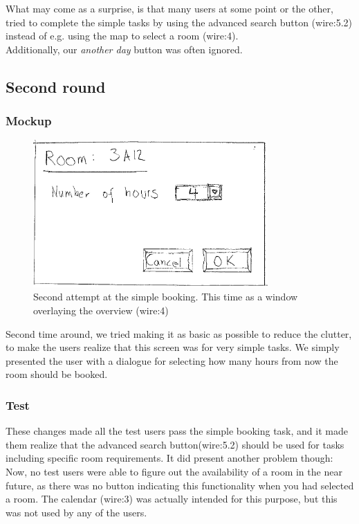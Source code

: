 What may come as a surprise, is that many users at some point or the other, tried to complete the simple tasks by using the advanced search button (wire:5.2) instead of e.g. using the map to select a room (wire:4). \\
Additionally, our \emph{another day} button was often ignored. \\
\pagebreak


\subsection{Second round}
\subsubsection{Mockup}
\begin{figure}[htb]
\begin{center}
\leavevmode
\includegraphics[width=0.8\textwidth]{images/bookRoomMockup2}
\end{center}
\caption{Second attempt at the simple booking. This time as a window overlaying the overview (wire:4)}
\label{fig:book_room_mockup2}
\end{figure}

Second time around, we tried making it as basic as possible to reduce the clutter, to make the users realize that this screen was for very simple tasks. We simply presented the user with a dialogue for selecting how many hours from now the room should be booked. 

\subsubsection{Test}
These changes made all the test users pass the simple booking task, and it made them realize that the advanced search button(wire:5.2) should be used for tasks including specific room requirements. It did present another problem though: Now, no test users were able to figure out the availability of a room in the near future, as there was no button indicating this functionality when you had selected a room. The calendar (wire:3) was actually intended for this purpose, but this was not used by any of the users.\\

